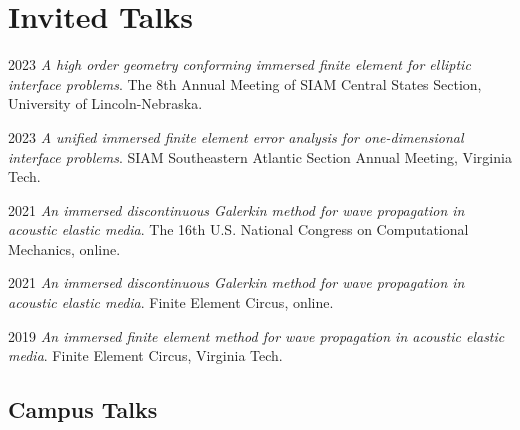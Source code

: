 \documentclass[11pt,letterpaper]{report}
\begin{document}
    \section*{Invited Talks}

    \begin{tablist}

        \item[2023] \tab{}\textit{A high order  geometry conforming immersed finite element for  elliptic interface problems}. The 8th Annual Meeting of SIAM Central States Section, University of Lincoln-Nebraska.
        
        \item[2023]\tab{}\textit{A unified immersed finite element error analysis for one-dimensional interface problems}. SIAM Southeastern Atlantic Section Annual Meeting, Virginia Tech.
        \item[2021] \tab{}\textit{An immersed discontinuous Galerkin method for wave propagation in acoustic
        elastic media}. The 16th U.S. National Congress on Computational Mechanics, online. 

        \item[2021] \tab{}\textit{An immersed discontinuous Galerkin method for wave propagation in acoustic
        elastic media}.  Finite Element Circus, online.

        \item[2019]\tab{}\textit{An immersed finite element method for wave propagation in acoustic
        elastic media}. Finite Element Circus, Virginia Tech.
    \end{tablist}
        

  
    \subsection*{Campus Talks}
\end{document}
